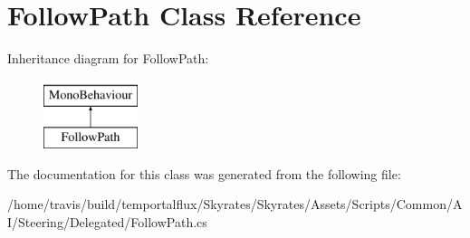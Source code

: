 \hypertarget{class_follow_path}{\section{Follow\-Path Class Reference}
\label{class_follow_path}
}
Inheritance diagram for Follow\-Path\-:\begin{figure}[H]
\begin{center}
\leavevmode
\includegraphics[height=2.000000cm]{class_follow_path}
\end{center}
\end{figure}


The documentation for this class was generated from the following file\-:\begin{DoxyCompactItemize}
\item 
/home/travis/build/temportalflux/\-Skyrates/\-Skyrates/\-Assets/\-Scripts/\-Common/\-A\-I/\-Steering/\-Delegated/Follow\-Path.\-cs\end{DoxyCompactItemize}

